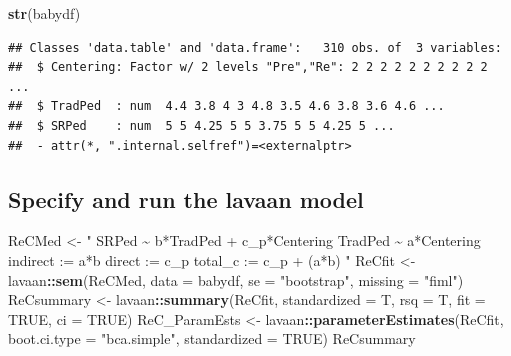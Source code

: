 \documentclass[
  11pt,
]{book}
\newenvironment{Shaded}{\begin{snugshade}}{\end{snugshade}}
\newcommand{\AttributeTok}[1]{\textcolor[rgb]{0.27,0.27,0.27}{#1}}
\newcommand{\ConstantTok}[1]{\textcolor[rgb]{0.37,0.37,0.37}{#1}}
\newcommand{\FunctionTok}[1]{\textcolor[rgb]{0.27,0.27,0.27}{\textbf{#1}}}
\newcommand{\NormalTok}[1]{#1}
\newcommand{\OtherTok}[1]{\textcolor[rgb]{0.37,0.37,0.37}{#1}}
\newcommand{\SpecialCharTok}[1]{\textcolor[rgb]{0.43,0.43,0.43}{\textbf{#1}}}
\newcommand{\StringTok}[1]{\textcolor[rgb]{0.5,0.5,0.5}{#1}}
\begin{document}
\begin{Shaded}
\begin{Highlighting}[]
\FunctionTok{str}\NormalTok{(babydf)}
\end{Highlighting}
\end{Shaded}

\begin{verbatim}
## Classes 'data.table' and 'data.frame':   310 obs. of  3 variables:
##  $ Centering: Factor w/ 2 levels "Pre","Re": 2 2 2 2 2 2 2 2 2 2 ...
##  $ TradPed  : num  4.4 3.8 4 3 4.8 3.5 4.6 3.8 3.6 4.6 ...
##  $ SRPed    : num  5 5 4.25 5 5 3.75 5 5 4.25 5 ...
##  - attr(*, ".internal.selfref")=<externalptr>
\end{verbatim}

\hypertarget{specify-and-run-the-lavaan-model}{%
\subsection*{Specify and run the lavaan model}\label{specify-and-run-the-lavaan-model}}


\begin{Shaded}
\begin{Highlighting}[]
\NormalTok{ReCMed }\OtherTok{\textless{}{-}} \StringTok{"}
\StringTok{          SRPed \textasciitilde{} b*TradPed + c\_p*Centering}
\StringTok{          TradPed \textasciitilde{} a*Centering}
\StringTok{          }
\StringTok{          indirect :=  a*b}
\StringTok{          direct  := c\_p}
\StringTok{          total\_c  := c\_p + (a*b)}
\StringTok{          "}
\NormalTok{ReCfit }\OtherTok{\textless{}{-}}\NormalTok{ lavaan}\SpecialCharTok{::}\FunctionTok{sem}\NormalTok{(ReCMed, }\AttributeTok{data =}\NormalTok{ babydf, }\AttributeTok{se =} \StringTok{"bootstrap"}\NormalTok{, }\AttributeTok{missing =} \StringTok{"fiml"}\NormalTok{)}
\NormalTok{ReCsummary }\OtherTok{\textless{}{-}}\NormalTok{ lavaan}\SpecialCharTok{::}\FunctionTok{summary}\NormalTok{(ReCfit, }\AttributeTok{standardized =}\NormalTok{ T, }\AttributeTok{rsq =}\NormalTok{ T, }\AttributeTok{fit =} \ConstantTok{TRUE}\NormalTok{,}
    \AttributeTok{ci =} \ConstantTok{TRUE}\NormalTok{)}
\NormalTok{ReC\_ParamEsts }\OtherTok{\textless{}{-}}\NormalTok{ lavaan}\SpecialCharTok{::}\FunctionTok{parameterEstimates}\NormalTok{(ReCfit, }\AttributeTok{boot.ci.type =} \StringTok{"bca.simple"}\NormalTok{,}
    \AttributeTok{standardized =} \ConstantTok{TRUE}\NormalTok{)}
\NormalTok{ReCsummary}
\end{Highlighting}
\end{Shaded}
\end{document}
